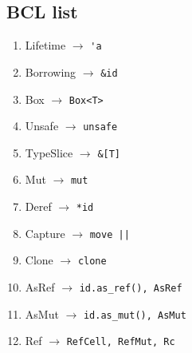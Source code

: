 \subsection{\label{sec:appendix}BCL list}

\begin{enumerate}
    \item Lifetime $\rightarrow$ \verb+'a+
    \item Borrowing $\rightarrow$ \verb+&id+
    \item Box $\rightarrow$ \verb+Box<T>+
    \item Unsafe $\rightarrow$ \verb+unsafe+
    \item TypeSlice $\rightarrow$ \verb+&[T]+
    \item Mut $\rightarrow$ \verb+mut+
    \item Deref $\rightarrow$ \verb+*id+
    \item Capture $\rightarrow$ \verb+move ||+
    \item Clone $\rightarrow$ \verb+clone+
    \item AsRef $\rightarrow$ \verb+id.as_ref(), AsRef+
    \item AsMut $\rightarrow$ \verb+id.as_mut(), AsMut+
    \item Ref $\rightarrow$ \verb+RefCell, RefMut, Rc+
\end{enumerate}